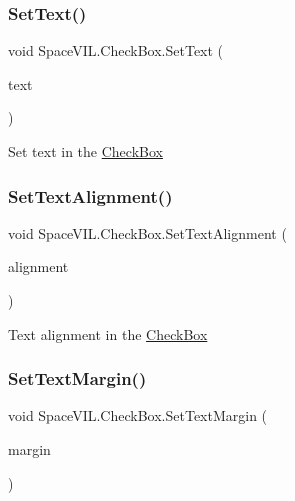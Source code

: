 \subsubsection{\texorpdfstring{Set\+Text()}{SetText()}}
{\footnotesize\ttfamily void Space\+V\+I\+L.\+Check\+Box.\+Set\+Text (\begin{DoxyParamCaption}\item[{String}]{text }\end{DoxyParamCaption})}



Set text in the \mbox{\hyperlink{class_space_v_i_l_1_1_check_box}{Check\+Box}} 

\mbox{\label{class_space_v_i_l_1_1_check_box_a71a14c9714447fe4d3c9347b920dbedb}} 
\subsubsection{\texorpdfstring{Set\+Text\+Alignment()}{SetTextAlignment()}}
{\footnotesize\ttfamily void Space\+V\+I\+L.\+Check\+Box.\+Set\+Text\+Alignment (\begin{DoxyParamCaption}\item[{Item\+Alignment}]{alignment }\end{DoxyParamCaption})}



Text alignment in the \mbox{\hyperlink{class_space_v_i_l_1_1_check_box}{Check\+Box}} 

\mbox{\label{class_space_v_i_l_1_1_check_box_a17a587e2ad59ded92f7ca6968285b8de}} 
\subsubsection{\texorpdfstring{Set\+Text\+Margin()}{SetTextMargin()}}
{\footnotesize\ttfamily void Space\+V\+I\+L.\+Check\+Box.\+Set\+Text\+Margin (\begin{DoxyParamCaption}\item[{\mbox{\hyperlink{struct_space_v_i_l_1_1_decorations_1_1_indents}{Indents}}}]{margin }\end{DoxyParamCaption})}



